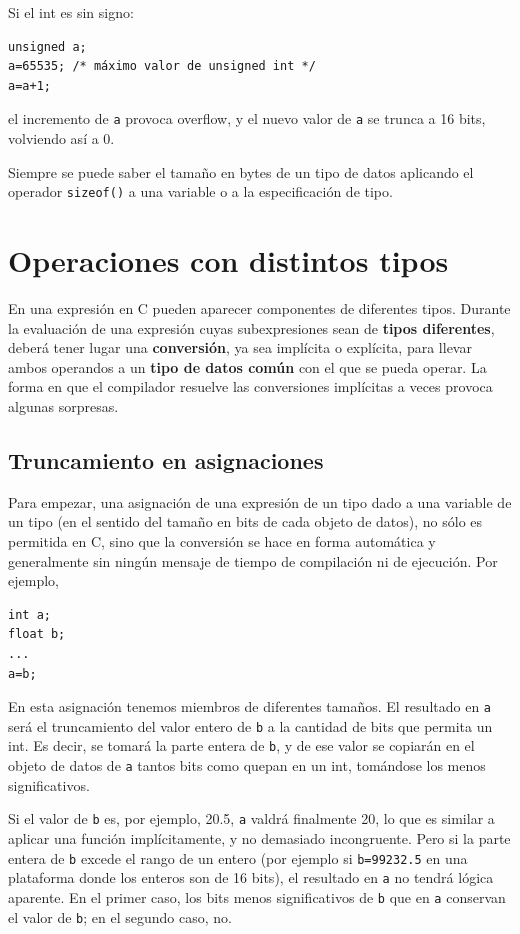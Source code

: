 Si el int es sin signo:

\begin{lstlisting}
unsigned a;
a=65535; /* máximo valor de unsigned int */
a=a+1; 
\end{lstlisting}

el incremento de \lstinline{a} provoca overflow, y el nuevo valor de \lstinline{a} se trunca a 16 bits, volviendo así a 0.

Siempre se puede saber el tamaño en bytes de un tipo de datos aplicando el operador \lstinline{sizeof()} a una
variable o a la especificación de tipo.

\section{Operaciones con distintos tipos}

En una expresión en C pueden aparecer componentes de diferentes tipos. Durante la evaluación de una
expresión cuyas subexpresiones sean de \textbf{tipos diferentes}, deberá tener lugar una \textbf{conversión}, ya sea
implícita o explícita, para llevar ambos operandos a un \textbf{tipo de datos común} con el que se pueda
operar. La forma en que el compilador resuelve las conversiones implícitas a veces provoca algunas
sorpresas.

\subsection{Truncamiento en asignaciones}

Para empezar, una asignación de una expresión de un tipo dado a una variable de un tipo  (en el sentido
del tamaño en bits de cada objeto de datos), no
sólo es permitida en C, sino que la conversión se hace en forma automática y generalmente sin ningún
mensaje de tiempo de compilación ni de ejecución. Por ejemplo,
\begin{lstlisting}
int a;
float b;
...
a=b;
\end{lstlisting}

En esta asignación tenemos miembros de diferentes tamaños. El resultado en \lstinline{a} será el truncamiento
del valor entero de \lstinline{b} a la cantidad de bits que permita un int. Es decir, se tomará la parte entera de \lstinline{b}, y
de ese valor se copiarán en el objeto de datos de \lstinline{a} tantos bits como quepan en un int, tomándose
los menos significativos.

Si el valor de \lstinline{b} es, por ejemplo, 20.5, \lstinline{a} valdrá finalmente 20, lo que es similar a aplicar una función
 implícitamente, y no demasiado incongruente. Pero si la parte entera de \lstinline{b} excede el
rango de un entero (por ejemplo si \lstinline{b=99232.5} en una plataforma donde los enteros son de 16 bits), el resultado en \lstinline{a} no tendrá lógica aparente. En el primer caso, los bits menos significativos de \lstinline{b} que  en \lstinline{a} conservan el valor de \lstinline{b}; en el segundo caso, no.

